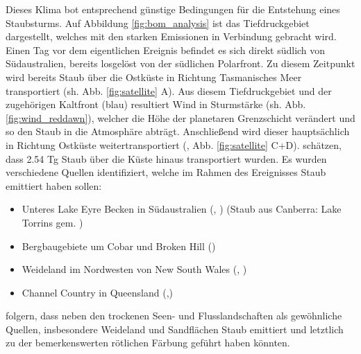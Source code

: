 \documentclass[12pt,a4paper,onecolumn,headheight=30pt]{scrartcl}
\begin{document}
Dieses Klima bot entsprechend günstige Bedingungen für die Entstehung eines Staubsturms. Auf Abbildung \ref{fig:bom_analysis} ist das Tiefdruckgebiet dargestellt, welches mit den starken Emissionen in Verbindung gebracht wird. Einen Tag vor dem eigentlichen Ereignis befindet es sich direkt südlich von Südaustralien, bereits losgelöst von der südlichen Polarfront. Zu diesem Zeitpunkt wird bereits Staub über die Ostküste in Richtung Tasmanisches Meer transportiert (sh. Abb. \ref{fig:satellite} A). Aus diesem Tiefdruckgebiet und der zugehörigen Kaltfront (blau) resultiert Wind in Sturmstärke (sh. Abb. \ref{fig:wind_reddawn}), welcher die Höhe der planetaren Grenzschicht verändert \citep{AlizadehChoobari.2012} und so den Staub in die Atmosphäre abträgt. Anschließend wird dieser hauptsächlich in Richtung Ostküste weitertransportiert (\cite{Leys.2011}, Abb. \ref{fig:satellite} C+D). \citet{Leys.2011} schätzen, dass 2.54 Tg Staub über die Küste hinaus transportiert wurden. Es wurden verschiedene Quellen identifiziert, welche im Rahmen des Ereignisses Staub emittiert haben sollen:
\begin{itemize}
\item Unteres Lake Eyre Becken in Südaustralien (\cite{Leys.2011}, \cite{Leys.2009}) (Staub aus Canberra: Lake Torrins gem. \cite{Deckker.2014})
\item Bergbaugebiete um Cobar und Broken Hill  (\cite{Leys.2011})
\item Weideland im Nordwesten von New South Wales (\cite{Leys.2011}, \cite{Leys.2009})
\item Channel Country in Queensland (\cite{Leys.2011},\cite{Leys.2009})
\end{itemize}
\citet{Leys.2011} folgern, dass neben den trockenen Seen- und Flusslandschaften als gewöhnliche Quellen, insbesondere Weideland und Sandflächen Staub emittiert und letztlich zu der bemerkenswerten rötlichen Färbung geführt haben könnten.
\end{document}
